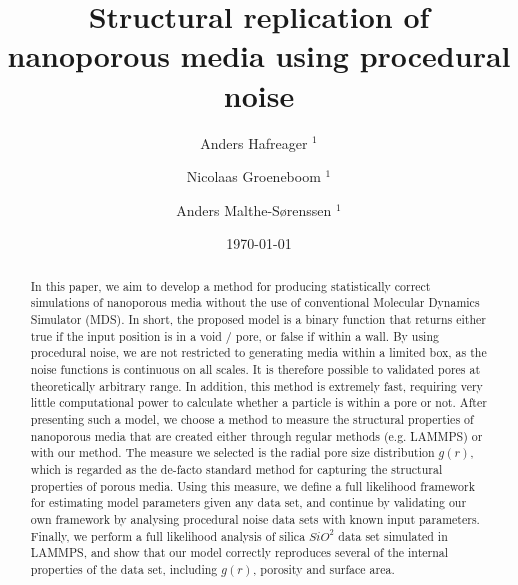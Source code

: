 \documentclass[aps,pre,twocolumn,letterpaper,floatfix,showpacs]{revtex4}
\begin{document}
\title{Structural replication of nanoporous media using procedural noise}
\author{Anders Hafreager $^{1}$} 
\author{Nicolaas Groeneboom $^{1}$} 
\author{Anders Malthe-S\o renssen $^1$}
\date{\today} 

\begin{abstract} 
In this paper, we aim to develop a method for producing statistically correct simulations of nanoporous media without the use of conventional Molecular Dynamics Simulator (MDS). In short, the proposed model is a binary function that returns either true if the input position is in a void / pore, or false if within a wall. By using procedural noise, we are not restricted to generating media within a limited box, as the noise functions is continuous on all scales. It is therefore possible to validated pores at theoretically arbitrary range. In addition, this method is extremely fast, requiring very little computational power to calculate whether a particle is within a pore or not. After presenting such a model, we choose a method to measure the structural properties of nanoporous media that are created either through regular methods (e.g. LAMMPS) or with our method. The measure we selected is the radial pore size distribution $g(r)$, which is regarded as the de-facto standard method for capturing the structural properties of porous media. Using this measure, we define a full likelihood framework for estimating model parameters given any data set, and continue by validating our own framework by analysing procedural noise data sets with known input parameters. Finally, we perform a full likelihood analysis of silica $SiO^2$ data set simulated in LAMMPS, and show that our model correctly reproduces several of the internal properties of the data set, including $g(r)$, porosity and surface area.     

\end{abstract} 
 
\maketitle
 
\end{document}
